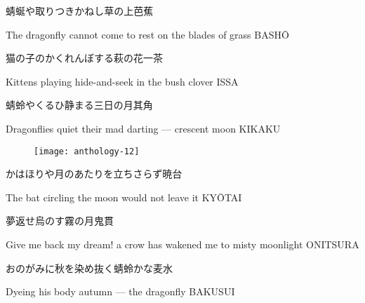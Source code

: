 \begin{haiku}
    {\FH 蜻蜒や取りつきかねし草の上}\hfill{\FH 芭蕉}

    \vin{} The dragonfly
    \vin{} \vin{} cannot come to rest
    \vin{} \vin{} \vin{} on the blades of grass \hspace{\fill} BASH\={O}
\end{haiku}

\begin{haiku}
    {\FH 猫の子のかくれんぼする萩の花}\hfill{\FH 一茶}

    \vin{} Kittens
    \vin{} \vin{} playing hide-and-seek
    \vin{} \vin{} \vin{} in the bush clover \hspace{\fill} ISSA
\end{haiku}

\begin{haiku}
    {\FH 蜻蛉やくるひ静まる三日の月}\hfill{\FH 其角}

    \vin{} Dragonflies
    \vin{} \vin{} quiet their mad darting ---
    \vin{} \vin{} \vin{} crescent moon \hspace{\fill} KIKAKU
\end{haiku}

\begin{figure}
    \texttt{[image: anthology-12]}
\end{figure}

\begin{haiku}
    {\FH かはほりや月のあたりを立ちさらず}\hfill{\FH 暁台}

    \vin{} The bat
    \vin{} \vin{} circling the moon
    \vin{} \vin{} \vin{} would not leave it \hspace{\fill} KY\={O}TAI
\end{haiku}

\begin{haiku}
    {\FH 夢返せ烏のす霧の月}\hfill{\FH 鬼貫}

    \vin{} Give me back my dream!
    \vin{} \vin{} a crow has wakened me
    \vin{} \vin{} \vin{} to misty moonlight \hspace{\fill} ONITSURA
\end{haiku}

\begin{haiku}
    {\FH おのがみに秋を染め抜く蜻蛉かな}\hfill{\FH 麦水}

    \vin{} Dyeing his body
    \vin{} \vin{} autumn ---
    \vin{} \vin{} \vin{} the dragonfly \hspace{\fill} BAKUSUI
\end{haiku}

